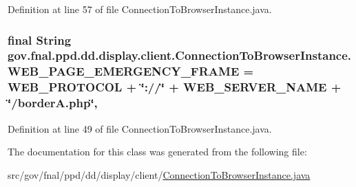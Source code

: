 Definition at line 57 of file Connection\-To\-Browser\-Instance.\-java.

\hypertarget{classgov_1_1fnal_1_1ppd_1_1dd_1_1display_1_1client_1_1ConnectionToBrowserInstance_a1081b866c3ae5aa9f6fe831ea3484d2c}{
\subsubsection[{W\-E\-B\-\_\-\-P\-A\-G\-E\-\_\-\-E\-M\-E\-R\-G\-E\-N\-C\-Y\-\_\-\-F\-R\-A\-M\-E}]{\setlength{\rightskip}{0pt plus 5cm}final String gov.\-fnal.\-ppd.\-dd.\-display.\-client.\-Connection\-To\-Browser\-Instance.\-W\-E\-B\-\_\-\-P\-A\-G\-E\-\_\-\-E\-M\-E\-R\-G\-E\-N\-C\-Y\-\_\-\-F\-R\-A\-M\-E = W\-E\-B\-\_\-\-P\-R\-O\-T\-O\-C\-O\-L + \char`\"{}\-://\char`\"{} + W\-E\-B\-\_\-\-S\-E\-R\-V\-E\-R\-\_\-\-N\-A\-M\-E + \char`\"{}/border\-A.\-php\char`\"{}\hspace{0.3cm}{\ttfamily [static]}, {\ttfamily [protected]}}}\label{classgov_1_1fnal_1_1ppd_1_1dd_1_1display_1_1client_1_1ConnectionToBrowserInstance_a1081b866c3ae5aa9f6fe831ea3484d2c}


Definition at line 49 of file Connection\-To\-Browser\-Instance.\-java.



The documentation for this class was generated from the following file\-:\begin{DoxyCompactItemize}
\item 
src/gov/fnal/ppd/dd/display/client/\hyperlink{ConnectionToBrowserInstance_8java}{Connection\-To\-Browser\-Instance.\-java}\end{DoxyCompactItemize}

